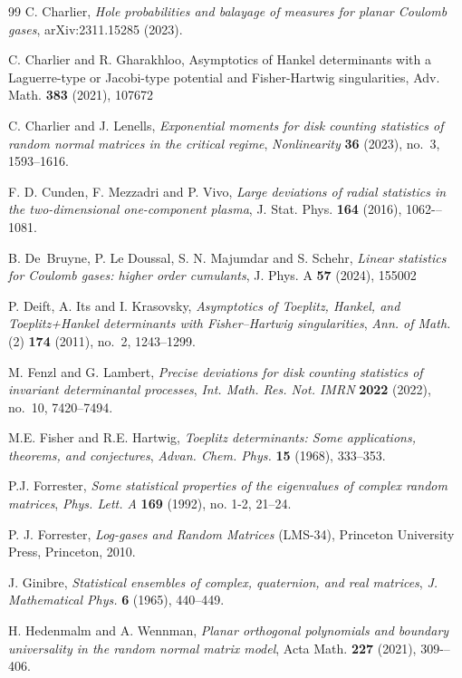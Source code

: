 \documentclass[a4paper]{article}
\numberwithin{equation}{section}
\begin{document}
\begin{thebibliography}{99}
C. Charlier,
\emph{Hole probabilities and balayage of measures for planar Coulomb gases},
arXiv:2311.15285 (2023).

C. Charlier and R. Gharakhloo, Asymptotics of Hankel determinants with a Laguerre-type or Jacobi-type potential and Fisher-Hartwig singularities, Adv. Math. {\bf 383} (2021), 107672

C. Charlier and J. Lenells,
\emph{Exponential moments for disk counting statistics of random normal matrices in the critical regime},
\textit{Nonlinearity} \textbf{36} (2023), no.~3, 1593--1616.

F. D. Cunden, F. Mezzadri and P. Vivo, \emph{Large deviations of radial statistics in the two-dimensional one-component plasma}, J. Stat. Phys. \textbf{164} (2016), 1062-–1081.

B. De~Bruyne, P. Le Doussal, S. N. Majumdar and S. Schehr, \emph{Linear statistics for Coulomb gases: higher order cumulants}, J. Phys. A {\bf 57} (2024), 155002

P. Deift, A. Its and I. Krasovsky,
\emph{Asymptotics of Toeplitz, Hankel, and Toeplitz+Hankel determinants with Fisher--Hartwig singularities},
\textit{Ann. of Math.} (2) \textbf{174} (2011), no.~2, 1243--1299.

M. Fenzl and G. Lambert,
\emph{Precise deviations for disk counting statistics of invariant determinantal processes},
\textit{Int. Math. Res. Not. IMRN} \textbf{2022} (2022), no.~10, 7420--7494.

 M.E. Fisher and R.E. Hartwig, \emph{Toeplitz determinants: Some applications, theorems, and conjectures}, \textit{Advan. Chem. Phys.} \textbf{15} (1968), 333--353.

 P.J. Forrester, \emph{Some statistical properties of the eigenvalues of complex random matrices}, \textit{Phys. Lett. A} \textbf{169} (1992), no. 1-2, 21--24.

P. J. Forrester, \emph{Log-gases and Random Matrices} (LMS-34), Princeton University Press, Princeton, 2010.

 J. Ginibre, \emph{Statistical ensembles of complex, quaternion, and real matrices}, \textit{J. Mathematical Phys.} \textbf{6} (1965), 440--449.

H. Hedenmalm and A. Wennman, \emph{Planar orthogonal polynomials and boundary universality in the random normal matrix model}, Acta Math. \textbf{227} (2021), 309-–406. 


\end{thebibliography}
\end{document}
